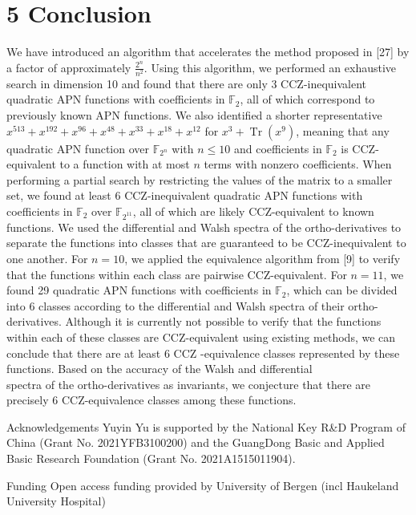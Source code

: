 \documentclass[10pt]{article}
\begin{document}
\section*{5 Conclusion}
We have introduced an algorithm that accelerates the method proposed in [27] by a factor of approximately $\frac{2^{n}}{n^{2}}$. Using this algorithm, we performed an exhaustive search in dimension 10 and found that there are only 3 CCZ-inequivalent quadratic APN functions with coefficients in $\mathbb{F}_{2}$, all of which correspond to previously known APN functions. We also identified a shorter representative $x^{513}+x^{192}+x^{96}+x^{48}+x^{33}+x^{18}+x^{12}$ for $x^{3}+\operatorname{Tr}\left(x^{9}\right)$, meaning that any quadratic APN function over $\mathbb{F}_{2^{n}}$ with $n \leq 10$ and coefficients in $\mathbb{F}_{2}$ is CCZ-equivalent to a function with at most $n$ terms with nonzero coefficients. When performing a partial search by restricting the values of the matrix to a smaller set, we found at least 6 CCZ-inequivalent quadratic APN functions with coefficients in $\mathbb{F}_{2}$ over $\mathbb{F}_{2^{11}}$, all of which are likely CCZ-equivalent to known functions. We used the differential and Walsh spectra of the ortho-derivatives to separate the functions into classes that are guaranteed to be CCZ-inequivalent to one another. For $n=10$, we applied the equivalence algorithm from [9] to verify that the functions within each class are pairwise CCZ-equivalent. For $n=11$, we found 29 quadratic APN functions with coefficients in $\mathbb{F}_{2}$, which can be divided into 6 classes according to the differential and Walsh spectra of their ortho-derivatives. Although it is currently not possible to verify that the functions within each of these classes are CCZ-equivalent using existing methods, we can conclude that there are at least 6 CCZ -equivalence classes represented by these functions. Based on the accuracy of the Walsh and differential\\
spectra of the ortho-derivatives as invariants, we conjecture that there are precisely 6 CCZ-equivalence classes among these functions.

Acknowledgements Yuyin Yu is supported by the National Key R\&D Program of China (Grant No. 2021YFB3100200) and the GuangDong Basic and Applied Basic Research Foundation (Grant No. 2021A1515011904).

Funding Open access funding provided by University of Bergen (incl Haukeland University Hospital)
\end{document}
